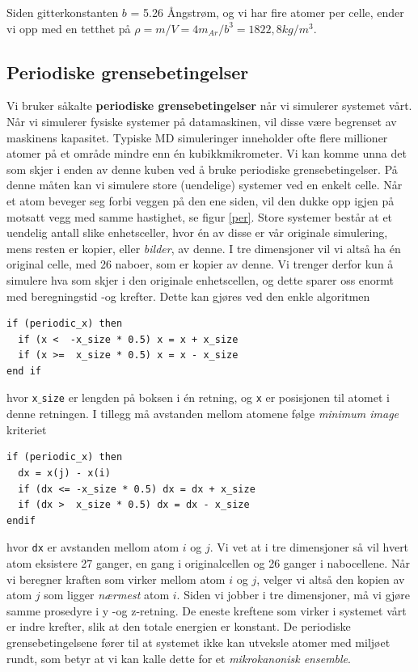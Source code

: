 \documentclass[paper=a4, fontsize=11pt]{scrartcl} %
\numberwithin{equation}{section} %
\numberwithin{figure}{section} %
\numberwithin{table}{section} %
\begin{document}
Siden gitterkonstanten $b$ = 5.26 Ångstrøm, og vi har fire atomer per celle, ender vi opp med en tetthet på $\rho = m/V = 4m_{Ar}/b^3 = 1822,8 kg/m^3$.




\subsection{Periodiske grensebetingelser}
Vi bruker såkalte \textbf{periodiske grensebetingelser} når vi simulerer systemet vårt. Når vi simulerer fysiske systemer på datamaskinen, vil disse være begrenset av maskinens kapasitet. Typiske MD simuleringer inneholder ofte flere millioner atomer på et område mindre enn én kubikkmikrometer. Vi kan komme unna det som skjer i enden av denne kuben ved å bruke periodiske grensebetingelser. På denne måten kan vi simulere store (uendelige) systemer ved en enkelt celle. Når et atom beveger seg forbi veggen på den ene siden, vil den dukke opp igjen på motsatt vegg med samme hastighet, se figur \ref{per}. Store systemer består at et uendelig antall slike enhetsceller, hvor én av disse er vår originale simulering, mens resten er kopier, eller \textit{bilder}, av denne. I tre dimensjoner vil vi altså ha én original celle, med 26 naboer, som er kopier av denne. Vi trenger derfor kun å simulere hva som skjer i den originale enhetscellen, og dette sparer oss enormt med beregningstid -og krefter. Dette kan gjøres ved den enkle algoritmen

\begin{lstlisting}
if (periodic_x) then
  if (x <  -x_size * 0.5) x = x + x_size
  if (x >=  x_size * 0.5) x = x - x_size
end if
\end{lstlisting}

hvor \texttt{x$\_$size} er lengden på boksen i én retning, og \texttt{x} er posisjonen til atomet i denne retningen. I tillegg må avstanden mellom atomene følge \textit{minimum image} kriteriet

\begin{lstlisting}
if (periodic_x) then
  dx = x(j) - x(i)
  if (dx <= -x_size * 0.5) dx = dx + x_size
  if (dx >  x_size * 0.5) dx = dx - x_size
endif
\end{lstlisting}

hvor \texttt{dx} er avstanden mellom atom $i$ og $j$. Vi vet at i tre dimensjoner så vil hvert atom eksistere 27 ganger, en gang i originalcellen og 26 ganger i nabocellene. Når vi beregner kraften som virker mellom atom $i$ og $j$, velger vi altså den kopien av atom $j$ som ligger \textit{nærmest} atom $i$.  Siden vi jobber i tre dimensjoner, må vi gjøre samme prosedyre i y -og z-retning. De eneste kreftene som virker i systemet vårt er indre krefter, slik at den totale energien er konstant. De periodiske grensebetingelsene fører til at systemet ikke kan utveksle atomer med miljøet rundt, som betyr at vi kan kalle dette for et \textit{mikrokanonisk ensemble}. 
\end{document}
